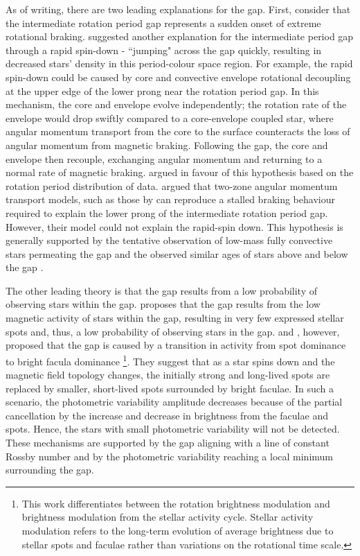 As of writing, there are two leading explanations for the gap.
First, consider that the intermediate rotation period gap represents a sudden onset of extreme rotational braking.
\citet{mcquillan_rotation_2014} suggested another explanation for the intermediate period gap through a rapid spin-down - ``jumping" across the gap quickly, resulting in decreased stars' density in this period-colour space region.
For example, the rapid spin-down could be caused by core and convective envelope rotational decoupling at the upper edge of the lower prong near the rotation period gap.
In this mechanism, the core and envelope evolve independently; the rotation rate of the envelope would drop swiftly compared to a core-envelope coupled star, where angular momentum transport from the core to the surface counteracts the loss of angular momentum from magnetic braking.
Following the gap, the core and envelope then recouple, exchanging angular momentum and returning to a normal rate of magnetic braking. 
\citet{gordon_stellar_2021} argued in favour of this hypothesis based on the rotation period distribution of \ktoo{} data. 
\citet{curtis_when_2020} argued that two-zone angular momentum transport models, such as those by \citet{spada_competing_2020} can reproduce a stalled braking behaviour required to explain the lower prong of the intermediate rotation period gap. However, their model could not explain the rapid-spin down.
This hypothesis is generally supported by the tentative observation of low-mass fully convective stars permeating the gap and the observed similar ages of stars above and below the gap \citep{lu_bridging_2022}.

The other leading theory is that the gap results from a low probability of observing stars within the gap.
\citet{chahal_statistics_2022} proposes that the gap results from the low magnetic activity of stars within the gap, resulting in very few expressed stellar spots and, thus, a low probability of observing stars in the gap.
\citet{reinhold_transition_2019} and \citet{reinhold_stellar_2020}, however, proposed that the gap is caused by a transition in activity from spot dominance to bright facula dominance \footnote{This work differentiates between the rotation brightness modulation and brightness modulation from the stellar activity cycle. Stellar activity modulation refers to the long-term evolution of average brightness due to stellar spots and faculae rather than variations on the rotational time scale.}.
They suggest that as a star spins down and the magnetic field topology changes, the initially strong and long-lived spots are replaced by smaller, short-lived spots surrounded by bright faculae.
In such a scenario, the photometric variability amplitude decreases because of the partial cancellation by the increase and decrease in brightness from the faculae and spots.
Hence, the stars with small photometric variability will not be detected.
These mechanisms are supported by the gap aligning with a line of constant Rossby number and by the photometric variability reaching a local minimum surrounding the gap.


